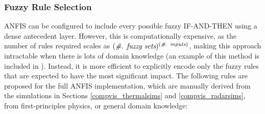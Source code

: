         
    \subsubsection{Fuzzy Rule Selection} \label{fuzzy_rules}
    

        ANFIS can be configured to include every possible fuzzy IF-AND-THEN using a dense antecedent layer. However, this is computationally expensive, as the number of rules required scales as \((\textit{\#. fuzzy sets})^\text{(\textit{\#. inputs})}\), making this approach intractable when there is lots of domain knowledge (an example of this method is included in \cite{jang1993anfis}). Instead, it is more efficient to explicitly encode only the fuzzy rules that are expected to have the most significant impact. The following rules are proposed for the full ANFIS implementation, which are manually derived from the simulations in Sections \ref{compvis_thermalsims} and \ref{compvis_radarsims}, from first-principles physics, or general domain knowledge:
        
